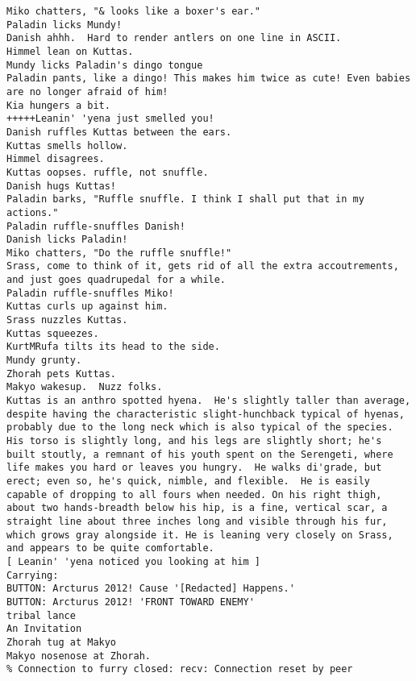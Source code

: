 \begin{verbatim}
Miko chatters, "& looks like a boxer's ear."
Paladin licks Mundy!
Danish ahhh.  Hard to render antlers on one line in ASCII.
Himmel lean on Kuttas.
Mundy licks Paladin's dingo tongue
Paladin pants, like a dingo! This makes him twice as cute! Even babies are no longer afraid of him!
Kia hungers a bit.
+++++Leanin' 'yena just smelled you!
Danish ruffles Kuttas between the ears.
Kuttas smells hollow.
Himmel disagrees.
Kuttas oopses. ruffle, not snuffle.
Danish hugs Kuttas!
Paladin barks, "Ruffle snuffle. I think I shall put that in my actions."
Paladin ruffle-snuffles Danish!
Danish licks Paladin!
Miko chatters, "Do the ruffle snuffle!"
Srass, come to think of it, gets rid of all the extra accoutrements, and just goes quadrupedal for a while.
Paladin ruffle-snuffles Miko!
Kuttas curls up against him.
Srass nuzzles Kuttas.
Kuttas squeezes.
KurtMRufa tilts its head to the side.
Mundy grunty.
Zhorah pets Kuttas.
Makyo wakesup.  Nuzz folks.
Kuttas is an anthro spotted hyena.  He's slightly taller than average, despite having the characteristic slight-hunchback typical of hyenas, probably due to the long neck which is also typical of the species.  His torso is slightly long, and his legs are slightly short; he's built stoutly, a remnant of his youth spent on the Serengeti, where life makes you hard or leaves you hungry.  He walks di'grade, but erect; even so, he's quick, nimble, and flexible.  He is easily capable of dropping to all fours when needed. On his right thigh, about two hands-breadth below his hip, is a fine, vertical scar, a straight line about three inches long and visible through his fur, which grows gray alongside it. He is leaning very closely on Srass, and appears to be quite comfortable.
[ Leanin' 'yena noticed you looking at him ]
Carrying:
BUTTON: Arcturus 2012! Cause '[Redacted] Happens.'
BUTTON: Arcturus 2012! 'FRONT TOWARD ENEMY'
tribal lance
An Invitation
Zhorah tug at Makyo
Makyo nosenose at Zhorah.
% Connection to furry closed: recv: Connection reset by peer
\end{verbatim}
\newpage

